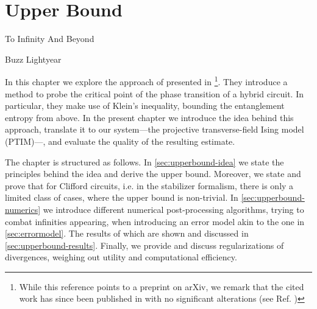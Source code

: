 \chapter{Upper Bound}
\label{ch:rel-ent}
\epigraph{To Infinity And Beyond}{Buzz Lightyear}

%
In this chapter we explore the approach of
\citeauthor{garrattProbingPostmeasurementEntanglement2023} presented in
\cite{garrattProbingPostmeasurementEntanglement2023}\footnote{While this
  reference points to a preprint on arXiv, we remark that the cited work has
since been published in
 with no
significant alterations (see Ref.
\cite{garrattProbingPostmeasurementEntanglement2024})}. They introduce a method
to probe the critical point of the phase transition of a hybrid circuit. In
particular, they make use of Klein's inequality, bounding the entanglement
entropy from above. In the present chapter we introduce the idea behind this
approach, translate it to our system---the projective transverse-field Ising
model (PTIM)---, and evaluate the quality of the resulting estimate. 

The chapter is structured as follows. In \cref{sec:upperbound-idea} we state
the principles behind the idea and derive the upper bound. Moreover, we state
and prove that for Clifford circuits, i.e. in the stabilizer formalism, there
is only a limited class of cases, where the upper bound is non-trivial. In
\cref{sec:upperbound-numerics} we introduce different numerical post-processing
algorithms, trying to combat infinities appearing, when introducing an error
model akin to the one in \cref{sec:errormodel}. The results of which are shown
and discussed in \cref{sec:upperbound-results}. Finally, we provide and discuss
regularizations of divergences, weighing out utility and computational
efficiency.

%
%
\clearpage
